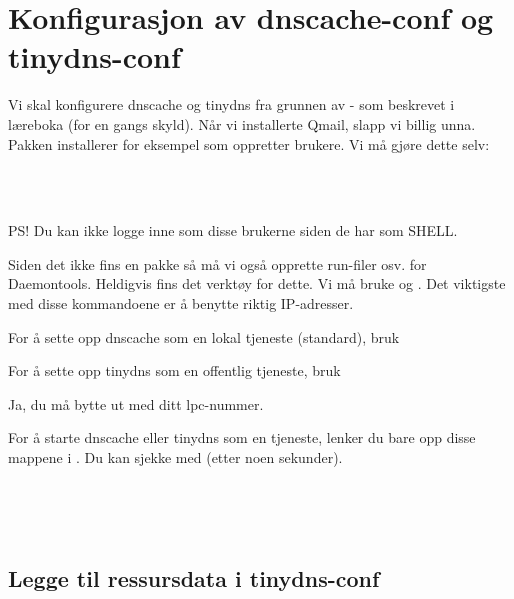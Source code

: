 \section{Konfigurasjon av dnscache-conf og tinydns-conf}



Vi skal konfigurere dnscache og tinydns fra grunnen av - som beskrevet i læreboka (for en gangs skyld).
Når vi installerte Qmail, slapp vi billig unna. Pakken  installerer for eksempel 
 som oppretter brukere. Vi må gjøre dette selv:

\\
\\

PS! Du kan ikke logge inne som disse brukerne siden de har  som SHELL. 

Siden det ikke fins en  pakke så må vi også opprette run-filer osv. for Daemontools.
Heldigvis fins det verktøy for dette. Vi må bruke  og .
Det viktigste med disse kommandoene er å benytte riktig IP-adresser.

For å sette opp dnscache som en lokal tjeneste (standard), bruk


For å sette opp tinydns som en offentlig tjeneste, bruk


Ja, du må bytte ut  med ditt lpc-nummer.
 
For å starte dnscache eller tinydns som en tjeneste, lenker 
du bare opp disse mappene i .
Du kan sjekke med  (etter noen sekunder).

\\

\\

\subsection{Legge til ressursdata i tinydns-conf}

